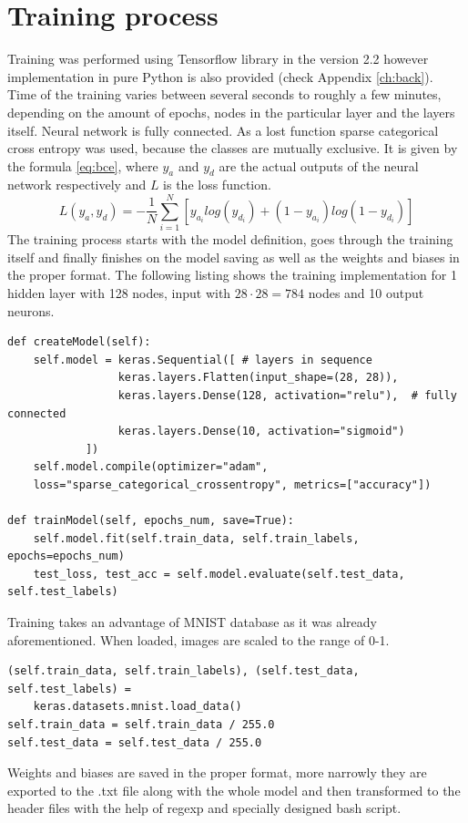 \section{Training process}
Training was performed using Tensorflow library in the version 2.2 however implementation in pure Python is also provided (check Appendix \ref{ch:back}). Time of the training varies between several seconds to roughly a few minutes, depending on the amount of epochs, nodes in the particular layer and the layers itself. Neural network is fully connected. As a lost function sparse categorical cross entropy was used, because the classes are mutually exclusive. It is given by the formula \ref{eq:bce}, where $y_a$ and $y_d$ are the actual outputs of the neural network respectively and $L$ is the loss function.
\begin{equation} \label{eq:bce}
L(y_a,y_d)=-\frac{1}{N}\sum_{i=1}^{N}[y_{a_i}log(y_{d_i})+(1-y_{a_i})log(1-y_{d_i})]
\end{equation}
The training process starts with the model definition, goes through the training itself and finally finishes on the model saving as well as the weights and biases in the proper format. The following listing shows the training implementation for 1 hidden layer with 128 nodes, input with $28\cdot28=784$ nodes and 10 output neurons.
\begin{verbatim}
def createModel(self):
    self.model = keras.Sequential([ # layers in sequence
                 keras.layers.Flatten(input_shape=(28, 28)),
                 keras.layers.Dense(128, activation="relu"),  # fully connected
                 keras.layers.Dense(10, activation="sigmoid")
            ])
    self.model.compile(optimizer="adam", 
    loss="sparse_categorical_crossentropy", metrics=["accuracy"])

def trainModel(self, epochs_num, save=True):
    self.model.fit(self.train_data, self.train_labels, epochs=epochs_num)
    test_loss, test_acc = self.model.evaluate(self.test_data, self.test_labels)
\end{verbatim}
Training takes an advantage of MNIST database as it was already aforementioned. When loaded, images are scaled to the range of 0-1.
\begin{verbatim}
(self.train_data, self.train_labels), (self.test_data, self.test_labels) = 
    keras.datasets.mnist.load_data()
self.train_data = self.train_data / 255.0
self.test_data = self.test_data / 255.0
\end{verbatim}
Weights and biases are saved in the proper format, more narrowly they are exported to the .txt file along with the whole model and then transformed to the header files with the help of regexp and specially designed bash script.


